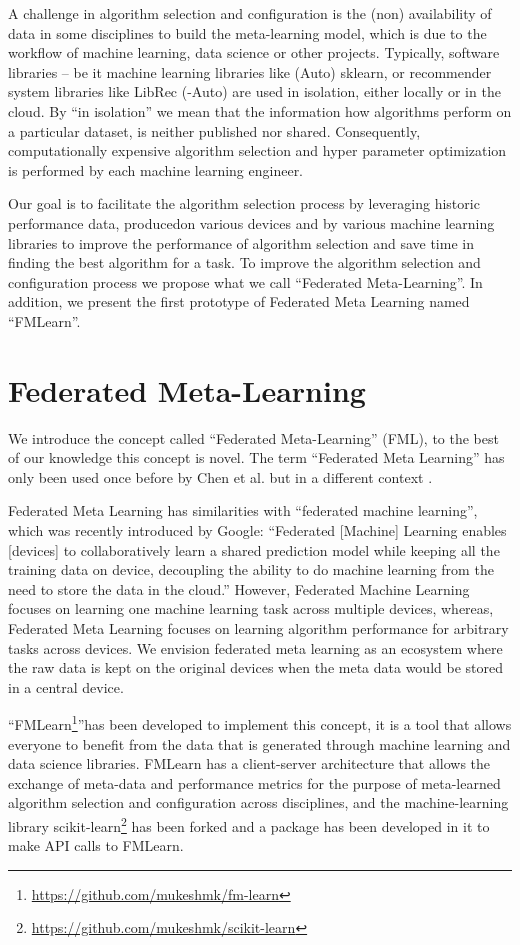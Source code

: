 \documentclass{article}
\begin{document}
A challenge in algorithm selection and configuration is the (non) availability of data in some disciplines to build the meta-learning model, which is due to the workflow of machine learning, data science or other projects. Typically, software libraries – be it machine learning libraries like (Auto) sklearn, or recommender system libraries like LibRec (-Auto) are used in isolation, either locally or in the cloud. By “in isolation” we mean that the information how algorithms perform on a particular dataset, is neither published nor shared. Consequently, computationally expensive algorithm selection and hyper parameter optimization is performed by each machine learning engineer. 

Our goal is to facilitate the algorithm selection process by leveraging historic performance data, producedon various devices and by various machine learning libraries to improve the performance of algorithm selection and save time in finding the best algorithm for a task. To improve the algorithm selection and configuration process we propose what we call “Federated Meta-Learning”. In addition, we present the first prototype of Federated Meta Learning named “FMLearn”. 


\section{Federated Meta-Learning}

We introduce the concept called “Federated Meta-Learning” (FML), to the best of our knowledge this concept is novel. The term “Federated Meta Learning” has only been used once before by Chen et al. but in a different context \cite{chen-et-al}. 

Federated Meta Learning has similarities with “federated machine learning”, which was recently introduced by Google: “Federated [Machine] Learning enables [devices] to collaboratively learn a shared prediction model while keeping all the training data on device, decoupling the ability to do machine learning from the need to store the data in the cloud.”\cite{brendan-et-al} However, Federated Machine Learning focuses on learning one machine learning task across multiple devices, whereas, Federated Meta Learning focuses on learning algorithm performance for arbitrary tasks across devices. We envision federated meta learning as an ecosystem where the raw data is kept on the original devices when the meta data would be stored in a central device.

“FMLearn\footnote{\url{https://github.com/mukeshmk/fm-learn}}”has been developed to implement this concept, it is a tool that allows everyone to benefit from the data that is generated through machine learning and data science libraries. FMLearn has a client-server architecture that allows the exchange of meta-data and performance metrics for the purpose of meta-learned algorithm selection and configuration across disciplines, and the machine-learning library scikit-learn\footnote{\url{https://github.com/mukeshmk/scikit-learn}} has been forked and a package has been developed in it to make API calls to FMLearn.
\end{document}
